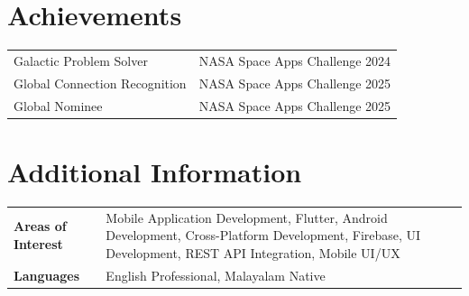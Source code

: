 \documentclass[a4paper,10pt]{article}
\begin{document}
\section*{Achievements}

\begin{tabular}{@{} p{9.5cm} p{8cm} @{}}
Galactic Problem Solver              & NASA Space Apps Challenge 2024 \\
Global Connection Recognition        & NASA Space Apps Challenge 2025 \\
Global Nominee                       & NASA Space Apps Challenge 2025 \\
\end{tabular}

\section*{Additional Information}

\begin{tabular}{@{} >{\bfseries}p{3.8cm} p{13cm} @{}}
Areas of Interest & Mobile Application Development, Flutter, Android Development, Cross-Platform Development, Firebase, UI Development, REST API Integration, Mobile UI/UX \\
Languages         & English Professional, Malayalam Native \\
\end{tabular}

\vspace{3pt}
\end{document}
